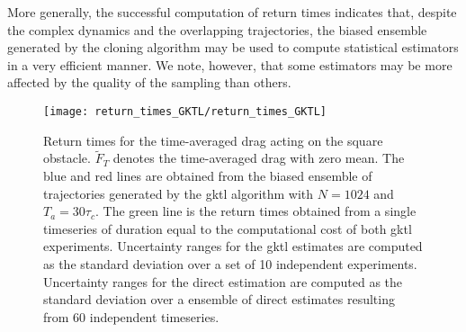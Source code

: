 More generally, the successful computation of return times indicates that, despite the complex dynamics and the overlapping trajectories, the biased ensemble generated by the cloning algorithm may be used to compute statistical estimators in a very efficient manner.
We note, however, that some estimators may be more affected by the quality of the sampling than others.

\begin{figure}
  \centering
  \texttt{[image: return\_times\_GKTL/return\_times\_GKTL]}
  \caption{\label{fig:return_times_gktl} Return times for the time-averaged drag acting on the square obstacle. $\tilde{F}_T$ denotes the time-averaged drag with zero mean. The blue and red lines are obtained from the biased ensemble of trajectories generated by the \ac{gktl} algorithm with $N=1024$ and $T_a=30\tau_c$. The green line is the return times obtained from a single timeseries of duration equal to the computational cost of both \ac{gktl} experiments. Uncertainty ranges for the \ac{gktl} estimates are computed as the standard deviation over a set of 10 independent experiments. Uncertainty ranges for the direct estimation are computed as the standard deviation over a ensemble of direct estimates resulting from 60 independent timeseries.}
\end{figure}


